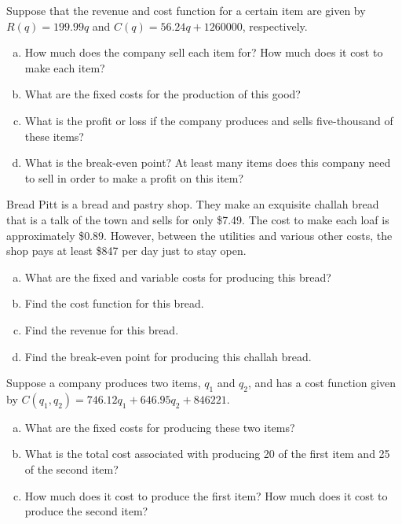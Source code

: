 \documentclass[11pt,letterpaper]{article}
\begin{document}

 Suppose that the revenue and cost function for a certain item are given by $R(q)= 199.99q$ and $C(q)= 56.24q + 1260000$, respectively. 
	\begin{enumerate}[(a)]
	\item How much does the company sell each item for? How much does it cost to make each item?
	\item What are the fixed costs for the production of this good?
	\item What is the profit or loss if the company produces and sells five-thousand of these items?
	\item What is the break-even point? At least many items does this company need to sell in order to make a profit on this item?
	\end{enumerate}



\newpage



 Bread Pitt is a bread and pastry shop. They make an exquisite challah bread that is a talk of the town and sells for only \$7.49. The cost to make each loaf is approximately \$0.89. However, between the utilities and various other costs, the shop pays at least \$847 per day just to stay open. 
	\begin{enumerate}[(a)]
	\item What are the fixed and variable costs for producing this bread?
	\item Find the cost function for this bread.
	\item Find the revenue for this bread.
	\item Find the break-even point for producing this challah bread. 
	\end{enumerate}



\newpage



 Suppose a company produces two items, $q_1$ and $q_2$, and has a cost function given by $C(q_1, q_2)= 746.12q_1 + 646.95q_2 + 846221$. 
	\begin{enumerate}[(a)]
	\item What are the fixed costs for producing these two items?
	\item What is the total cost associated with producing 20 of the first item and 25 of the second item?
	\item How much does it cost to produce the first item? How much does it cost to produce the second item?
	\end{enumerate}
\end{document}
